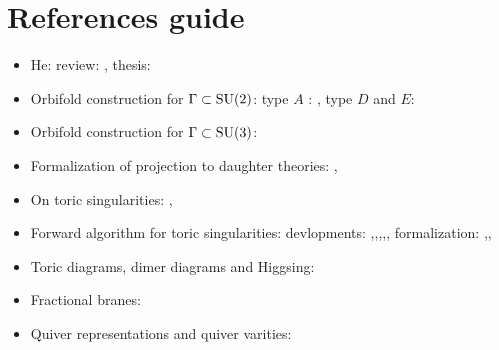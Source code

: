 \documentclass[a4paper,10pt]{article}
\begin{document}
\section{References guide}

\begin{itemize}
    \item He: review: \cite{he2004lectures}, thesis: \cite{masterHe}
    \item Orbifold construction for $\Gamma\subset\text{SU}(2)$: type $A$ : \cite{douglas1996dbranes}, type $D$ and $E$: \cite{PhysRevD.55.6382}
    \item Orbifold construction for $\Gamma\subset\text{SU}(3)$:\cite{Hanany_1999}
    \item Formalization of projection to daughter theories: \cite{vafa1998},\cite{silervstein1998}
    \item On toric singularities: \cite{fulton1993introduction},\cite{oda1988convex}
    \item Forward algorithm  for toric singularities: devlopments: \cite{FA1},\cite{FA2},\cite{FA3},\cite{FA4},\cite{FA5}, formalization: \cite{FA6},\cite{FA7},\cite{FA8}
    \item Toric diagrams, dimer diagrams and Higgsing: \cite{Argurio_20081}
    \item Fractional branes: \cite{Argurio_20082}
    \item Quiver representations and quiver varities: \cite{kirillov2016quiver}
\end{itemize}

\pagebreak

\listofmarker
{}

\pagebreak

\printbibliography
\end{document}
